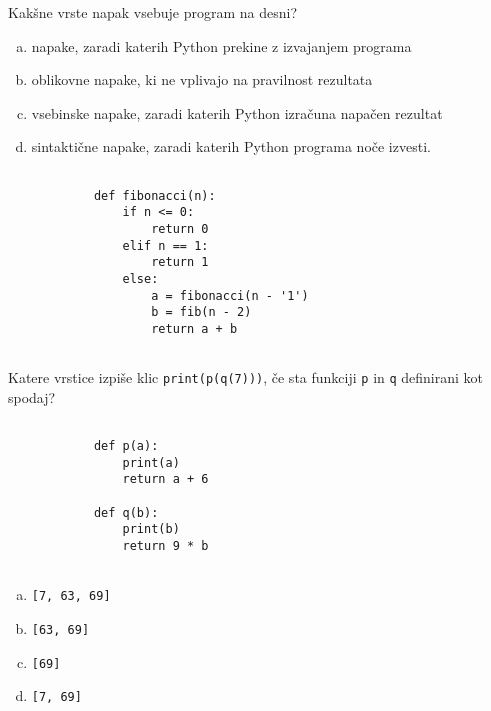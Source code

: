 \documentclass[arhiv, 10pt]{../izpit}
\newcommand{\inlinepy}[1]{\texttt{#1}}
\begin{document}
        \naloga*
        \begin{multicols}{2}
        \noindent
        Kakšne vrste napak vsebuje program na desni?

        \begin{enumerate}[(a)]
\item napake, zaradi katerih Python prekine z izvajanjem programa
\item oblikovne napake, ki ne vplivajo na pravilnost rezultata
\item vsebinske napake, zaradi katerih Python izračuna napačen rezultat
\item sintaktične napake, zaradi katerih Python programa noče izvesti.
\end{enumerate}

        \columnbreak

        \begin{verbatim}
        
            def fibonacci(n):
                if n <= 0:
                    return 0
                elif n == 1:
                    return 1
                else:
                    a = fibonacci(n - '1')
                    b = fib(n - 2)
                    return a + b
            
        \end{verbatim}

        \end{multicols}

    
        \naloga*
        Katere vrstice izpiše klic \inlinepy{print(p(q(7)))}, če sta funkciji \inlinepy{p} in \inlinepy{q} definirani kot spodaj?

        \begin{multicols}{2}
        \begin{verbatim}
        
            def p(a):
                print(a)
                return a + 6

            def q(b):
                print(b)
                return 9 * b
        
        \end{verbatim}

        \begin{enumerate}[(a)]
\item \inlinepy{[7, 63, 69]}
\item \inlinepy{[63, 69]}
\item \inlinepy{[69]}
\item \inlinepy{[7, 69]}
\end{enumerate}

        \end{multicols}
    
\end{document}
